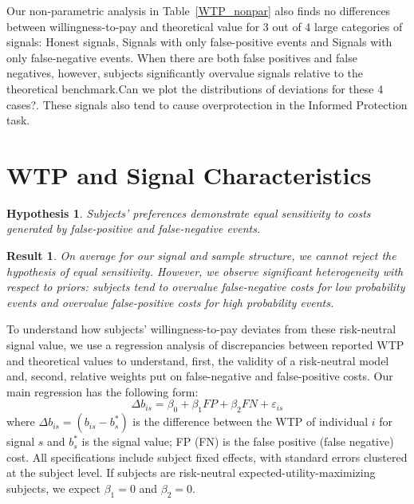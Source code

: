 \documentclass[12pt,a4paper]{article}
\newcommand{\pmt}[1]{{\color{Blue}#1}}
\newtheorem{hypothesis}{Hypothesis}
\newtheorem{result}{Result}
\begin{document}
Our non-parametric analysis in Table~\ref{WTP_nonpar} also finds no differences between willingness-to-pay and theoretical value for 3 out of 4 large categories of signals: Honest signals, Signals with only false-positive events and Signals with only false-negative events. When there are both false positives and false negatives, however, subjects significantly overvalue signals relative to the theoretical benchmark.\pmt{Can we plot the distributions of deviations for these 4 cases?}. These signals also tend to cause overprotection in the Informed Protection task.









\vspace{20pt}
\section{WTP and Signal Characteristics}\label{sec:results}

\begin{hypothesis} Subjects' preferences demonstrate equal sensitivity to costs generated by false-positive and false-negative events. \end{hypothesis}

\begin{result} On average for our signal and sample structure, we cannot reject the hypothesis of equal sensitivity. However, we observe significant heterogeneity with respect to priors: subjects tend to overvalue false-negative costs for low probability events and overvalue false-positive costs for high probability events. \end{result}

To understand how subjects' willingness-to-pay deviates from these risk-neutral signal value, we use a regression analysis of discrepancies between reported WTP and theoretical values to understand, first, the validity of a risk-neutral model and, second, relative weights put on false-negative and false-positive costs. Our main regression has the following form:
\[\Delta b_{is} = \beta_0 + \beta_1 FP + \beta_2 FN + \varepsilon_{is}\]
where $\Delta b_{is} = (b_{is} - b^*_s)$ is the difference between the WTP of individual $i$ for signal $s$ and $b^*_s$ is the signal value; FP (FN) is the false positive (false negative) cost. All specifications include subject fixed effects, with standard errors clustered at the subject level. If subjects are risk-neutral expected-utility-maximizing subjects, we expect $\beta_1=0$ and $\beta_2=0$.
\end{document}
